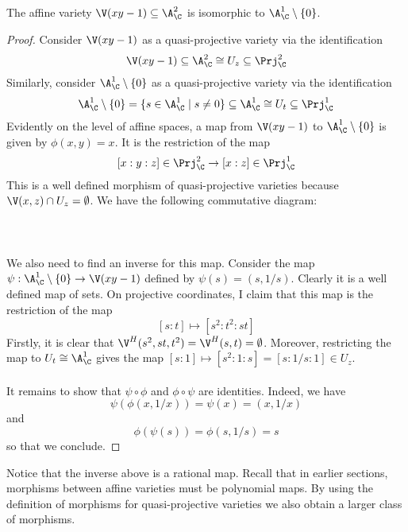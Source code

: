 \documentclass[a4paper]{article}
\begin{document}
\begin{eg}{}{} The affine variety $\V(xy-1)\subseteq\A_\C^2$ is isomorphic to $\A_\C^1\setminus\{0\}$. \tcbline
\begin{proof}
Consider $\V(xy-1)$ as a quasi-projective variety via the identification $$\V(xy-1)\subseteq\A_\C^2\cong U_z\subseteq\Prj_\C^2$$ Similarly, consider $\A_\C^1\setminus\{0\}$ as a quasi-projective variety via the identification $$\A_\C^1\setminus\{0\}=\{s\in\A_\C^1\;|\;s\neq 0\}\subseteq\A_\C^1\cong U_t\subseteq\Prj_\C^1$$ Evidently on the level of affine spaces, a map from $\V(xy-1)$ to $\A_\C^1\setminus\{0\}$ is given by $\phi(x,y)=x$. It is the restriction of the map $$[x:y:z]\in\Prj_\C^2\to[x:z]\in\Prj_\C^1$$ This is a well defined morphism of quasi-projective varieties because $\V(x,z)\cap U_z=\emptyset$. We have the following commutative diagram: \\~\\
 \\~\\
We also need to find an inverse for this map. Consider the map $\psi:\A_\C^1\setminus\{0\}\to\V(xy-1)$ defined by $\psi(s)=(s,1/s)$. Clearly it is a well defined map of sets. On projective coordinates, I claim that this map is the restriction of the map $$[s:t]\mapsto[s^2:t^2:st]$$ Firstly, it is clear that $\V^H(s^2,st,t^2)=\V^H(s,t)=\emptyset$. Moreover, restricting the map to $U_t\cong\A_\C^1$ gives the map $[s:1]\mapsto[s^2:1:s]=[s:1/s:1]\in U_z$. \\~\\

It remains to show that $\psi\circ\phi$ and $\phi\circ\psi$ are identities. Indeed, we have $$\psi(\phi(x,1/x))=\psi(x)=(x,1/x)$$ and $$\phi(\psi(s))=\phi(s,1/s)=s$$ so that we conclude. 
\end{proof}
\end{eg}

Notice that the inverse above is a rational map. Recall that in earlier sections, morphisms between affine varieties must be polynomial maps. By using the definition of morphisms for quasi-projective varieties we also obtain a larger class of morphisms. \\
\end{document}
